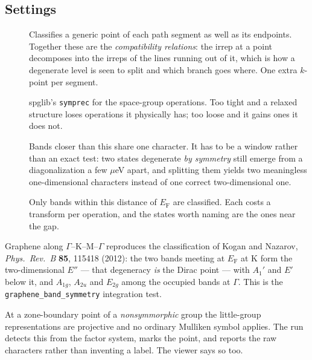 \subsection{Settings}

\begin{description}
  \item[] Classifies a
    generic point of each path segment as well as its endpoints. Together
    these are the \emph{compatibility relations}: the irrep at a point
    decomposes into the irreps of the lines running out of it, which is how a
    degenerate level is seen to split and which branch goes where. One extra
    $k$-point per segment.
  \item[] spglib's \texttt{symprec} for the
    space-group operations. Too tight and a relaxed structure loses operations
    it physically has; too loose and it gains ones it does not.
  \item[] Bands closer than this share one character.
    It has to be a window rather than an exact test: two states degenerate
    \emph{by symmetry} still emerge from a diagonalization a few $\mu$eV
    apart, and splitting them yields two meaningless one-dimensional
    characters instead of one correct two-dimensional one.
  \item[] Only bands within this distance of $E_\text{F}$
    are classified. Each costs a transform per operation, and the states worth
    naming are the ones near the gap.
\end{description}

\begin{caltip}
Graphene along $\Gamma$--K--M--$\Gamma$ reproduces the classification of
Kogan and Nazarov, \emph{Phys.\ Rev.\ B} \textbf{85}, 115418 (2012): the two
bands meeting at $E_\text{F}$ at K form the two-dimensional $E''$ --- that
degeneracy \emph{is} the Dirac point --- with $A_1'$ and $E'$ below it, and
$A_{1g}$, $A_{2u}$ and $E_{2g}$ among the occupied bands at $\Gamma$. This is
the \texttt{graphene\_band\_symmetry} integration test.
\end{caltip}

\begin{calwarn}
At a zone-boundary point of a \emph{nonsymmorphic} group the little-group
representations are projective and no ordinary Mulliken symbol applies. The
run detects this from the factor system, marks the point, and reports the raw
characters rather than inventing a label. The viewer says so too.
\end{calwarn}

